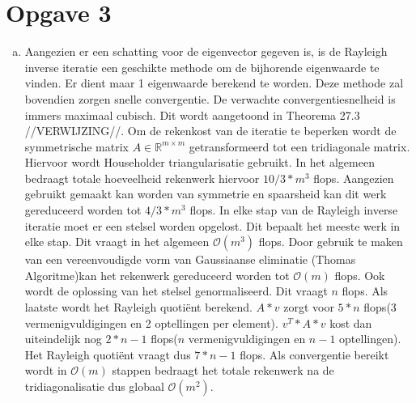\documentclass[a4paper]{article}
\newcommand{\opgave}[1]{\section*{Opgave #1}}
\begin{document}
\opgave{3}
\begin{enumerate}[a)] %
\item 
Aangezien er een schatting voor de eigenvector gegeven is, is de Rayleigh inverse iteratie een geschikte methode om de bijhorende eigenwaarde te vinden. Er dient maar 1 eigenwaarde berekend te worden. Deze methode zal bovendien zorgen snelle convergentie. De verwachte convergentiesnelheid is immers maximaal cubisch. Dit wordt aangetoond in Theorema 27.3 //VERWIJZING//. Om de rekenkost van de iteratie te beperken wordt de symmetrische matrix $A \in \mathbb{R}^{m\times m}$ getransformeerd tot een tridiagonale matrix. Hiervoor wordt Householder triangularisatie gebruikt. In het algemeen bedraagt totale hoeveelheid rekenwerk hiervoor  $10/3*m^3$ flops. Aangezien gebruikt gemaakt kan worden van symmetrie en spaarsheid kan dit werk gereduceerd worden tot $4/3*m^3$ flops. In elke stap van de Rayleigh inverse iteratie moet er een stelsel worden opgelost. Dit bepaalt het meeste werk in elke stap. Dit vraagt in het algemeen $\mathcal{O} (m^3)$ flops. Door gebruik te maken van een vereenvoudigde vorm van Gaussiaanse eliminatie (Thomas Algoritme)kan het rekenwerk gereduceerd worden tot $\mathcal{O} (m)$ flops. Ook wordt de oplossing van het stelsel genormaliseerd. Dit vraagt $n$ flops. Als laatste wordt het Rayleigh quoti\"ent berekend. $A*v$ zorgt voor $5*n$ flops(3 vermenigvuldigingen en 2 optellingen per element). $v^{T}*A*v$ kost dan uiteindelijk nog $2*n-1$ flops($n$ vermenigvuldigingen en $n-1$ optellingen). Het Rayleigh quoti\"ent vraagt dus $7*n-1$ flops. Als convergentie bereikt wordt in $\mathcal{O} (m)$ stappen bedraagt het totale rekenwerk na de tridiagonalisatie dus globaal $\mathcal{O} (m^2)$.


\end{enumerate}
\end{document}

